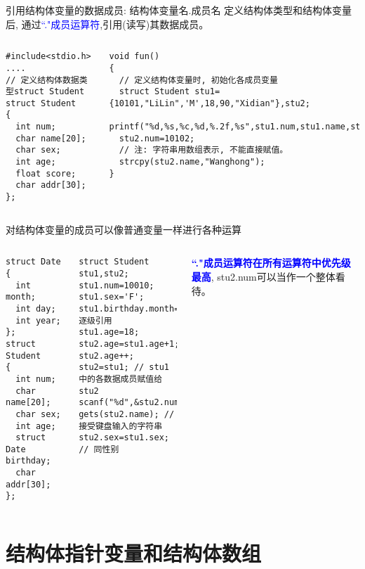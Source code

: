 \begin{frame}{引用结构体变量的数据成员: 结构体变量名.成员名}
定义结构体类型和结构体变量后, 通过\textcolor{blue}{``."成员运算符},引用(读写)其数据成员。
\vspace{-0.3cm}
\begin{columns}[T]
\begin{lstlisting}
#include<stdio.h>
....
// 定义结构体数据类型struct Student
struct Student 
{
  int num;
  char name[20]; 
  char sex; 
  int age; 
  float score; 
  char addr[30]; 
};         
\end{lstlisting}
\begin{lstlisting}[frame=leftline]
void fun()
{
  // 定义结构体变量时, 初始化各成员变量
  struct Student stu1={10101,"LiLin",'M',18,90,"Xidian"},stu2; 
  printf("%d,%s,%c,%d,%.2f,%s",stu1.num,stu1.name,stu1.sex,stu1.age,stu1.score,stu1.addr);
  stu2.num=10102;
  // 注: 字符串用数组表示, 不能直接赋值。
  strcpy(stu2.name,"Wanghong");   
}
\end{lstlisting}
\end{columns}
\end{frame}

\begin{frame}{\small 对结构体变量的成员可以像普通变量一样进行各种运算}
\vspace{-0.5cm}
\begin{columns}[T]
\begin{lstlisting}
struct Date  
{
  int month; 
  int day;   
  int year;  
}; 
struct Student 
{ 
  int num;
  char name[20];
  char sex;
  int age;
  struct Date birthday;
  char addr[30]; 
};
\end{lstlisting}
\begin{lstlisting}[frame=leftline]
struct Student stu1,stu2;
stu1.num=10010;
stu1.sex='F';
stu1.birthday.month=6;// 逐级引用
stu1.age=18;
stu2.age=stu1.age+1;
stu2.age++;
stu2=stu1; // stu1中的各数据成员赋值给stu2
scanf("%d",&stu2.num);
gets(stu2.name); // 接受键盘输入的字符串
stu2.sex=stu1.sex; // 同性别
\end{lstlisting}
\textbf{\textcolor{blue}{``."成员运算符在所有运算符中优先级最高}}, stu2.num可以当作一个整体看待。
\end{columns}
\medskip
\end{frame}

\section{结构体指针变量和结构体数组}

